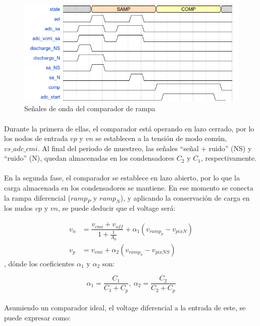 \begin{figure}[h]
	\includegraphics[width=\textwidth]{img/adc_wave.png}
	\caption{Señales de onda del comparador de rampa}
	\label{fig:adc_wave}
\end{figure}

\paragraph{}
Durante la primera de ellas, el comparador está operando en lazo cerrado, por lo
los nodos de entrada $vp$ y $vn$ se establecen a la tensión de modo
común, $vs\_adc\_cmi$. Al final del periodo de muestreo, las señales
``señal + ruido'' (NS) y ``ruido'' (N), quedan almacenadas en los condensadores $C_2$
y $C_1$, respectivamente.

\paragraph{}
En la segunda fase, el comparador se establece en lazo abierto, por lo que la carga
almacenada en los condensadores se mantiene. En ese momento se conecta la
rampa diferencial ($ramp_P$ y $ramp_N$), y aplicando la conservación de carga en los
nudos $vp$ y $vn$, se puede deducir que el voltage será:

\begin{align}
	v_n &= \dfrac{v_{cmi} + v_{off}}{1+\frac{1}{A_0}} + \alpha_1 (v_{ramp_p}-v_{pixN})\\
	v_p &= v_{cmi} + \alpha_2 (v_{ramp_n}-v_{pixNS})
\end{align}
, dónde los coeficientes $\alpha_1$ y $\alpha_2$ son:

\begin{equation}
	\alpha_1 = \dfrac{C_1}{C_1+C_p},~
	\alpha_2 = \dfrac{C_2}{C_2+C_p}
\end{equation}

\paragraph{}
Asumiendo un comparador ideal, el voltage diferencial a la entrada de este, se
puede expresar como:

